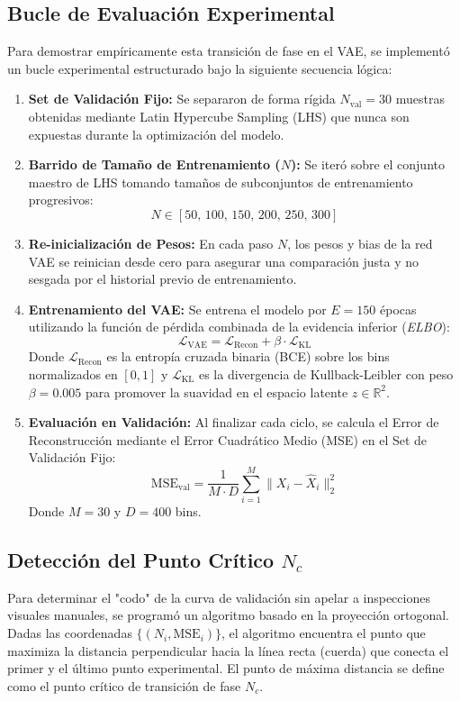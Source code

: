 \documentclass[12pt,letterpaper]{article}
\begin{document}
\subsection{Bucle de Evaluación Experimental}
Para demostrar empíricamente esta transición de fase en el VAE, se implementó un bucle experimental estructurado bajo la siguiente secuencia lógica:
\begin{enumerate}
    \item \textbf{Set de Validación Fijo:} Se separaron de forma rígida $N_{\text{val}} = 30$ muestras obtenidas mediante Latin Hypercube Sampling (LHS) que nunca son expuestas durante la optimización del modelo.
    \item \textbf{Barrido de Tamaño de Entrenamiento ($N$):} Se iteró sobre el conjunto maestro de LHS tomando tamaños de subconjuntos de entrenamiento progresivos:
    \begin{equation}
        N \in [50,\, 100,\, 150,\, 200,\, 250,\, 300]
    \end{equation}
    \item \textbf{Re-inicialización de Pesos:} En cada paso $N$, los pesos y bias de la red VAE se reinician desde cero para asegurar una comparación justa y no sesgada por el historial previo de entrenamiento.
    \item \textbf{Entrenamiento del VAE:} Se entrena el modelo por $E = 150$ épocas utilizando la función de pérdida combinada de la evidencia inferior (\textit{ELBO}):
    \begin{equation}
        \mathcal{L}_{\text{VAE}} = \mathcal{L}_{\text{Recon}} + \beta \cdot \mathcal{L}_{\text{KL}}
    \end{equation}
    Donde $\mathcal{L}_{\text{Recon}}$ es la entropía cruzada binaria (BCE) sobre los bins normalizados en $[0,1]$ y $\mathcal{L}_{\text{KL}}$ es la divergencia de Kullback-Leibler con peso $\beta = 0.005$ para promover la suavidad en el espacio latente $z \in \mathbb{R}^2$.
    \item \textbf{Evaluación en Validación:} Al finalizar cada ciclo, se calcula el Error de Reconstrucción mediante el Error Cuadrático Medio (MSE) en el Set de Validación Fijo:
    \begin{equation}
        \text{MSE}_{\text{val}} = \frac{1}{M \cdot D} \sum_{i=1}^{M} \|X_i - \hat{X}_i\|_2^2
    \end{equation}
    Donde $M = 30$ y $D = 400$ bins.
\end{enumerate}

\subsection{Detección del Punto Crítico $N_c$}
Para determinar el "codo" de la curva de validación sin apelar a inspecciones visuales manuales, se programó un algoritmo basado en la proyección ortogonal. Dadas las coordenadas $\{(N_i, \text{MSE}_i)\}$, el algoritmo encuentra el punto que maximiza la distancia perpendicular hacia la línea recta (cuerda) que conecta el primer y el último punto experimental. El punto de máxima distancia se define como el punto crítico de transición de fase $N_c$.
\end{document}
